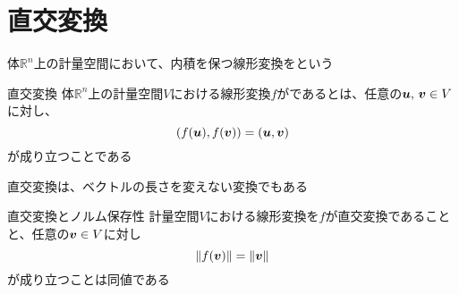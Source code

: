 \documentclass[../../../topic_linear-algebra]{subfiles}
\begin{document}
\sectionline
\section{直交変換}

体$\mathbb{R}^n$上の計量空間において、内積を保つ線形変換をという

\begin{definition}{直交変換}
  体$\mathbb{R}^n$上の計量空間$V$における線形変換$f$がであるとは、任意の$\vb*{u},\,\vb*{v} \in V$に対し、
  \begin{equation*}
    (f(\vb*{u}),f(\vb*{v})) = (\vb*{u},\vb*{v})
  \end{equation*}
  が成り立つことである
\end{definition}

直交変換は、ベクトルの長さを変えない変換でもある

\begin{theorem}{直交変換とノルム保存性}
  計量空間$V$における線形変換を$f$が直交変換であることと、任意の$\vb*{v} \in V$に対し
  \begin{equation*}
    \|f(\vb*{v})\| = \|\vb*{v}\|
  \end{equation*}
  が成り立つことは同値である
\end{theorem}
\end{document}

